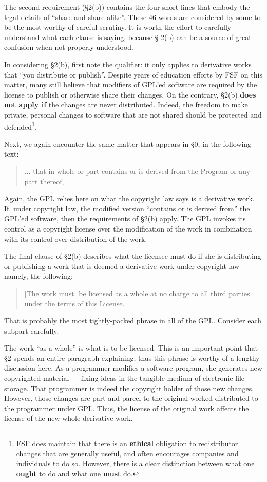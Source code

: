 \documentclass[12pt]{report}
\begin{document}
\medskip

The second requirement (\S 2(b)) contains the four short lines that embody
the legal details of ``share and share alike''.  These 46 words are
considered by some to be the most worthy of careful scrutiny.  It is worth
the effort to carefully understand what each clause is saying, because \S
2(b) can be a source of great confusion when not properly understood.

In considering \S 2(b), first note the qualifier: it only applies to
derivative works that ``you distribute or publish''.  Despite years of
education efforts by FSF on this matter, many still believe that modifiers
of GPL'ed software are required by the license to publish or otherwise
share their changes.  On the contrary, \S 2(b) {\bf does not apply if} the
changes are never distributed.  Indeed, the freedom to make private,
personal changes to software that are not shared should be protected and
defended\footnote{FSF does maintain that there is an {\bf ethical}
  obligation to redistributor changes that are generally useful, and often
  encourages companies and individuals to do so.  However, there is a
  clear distinction between what one {\bf ought} to do and what one {\bf
    must} do.}.

Next, we again encounter the same matter that appears in \S 0, in the
following text:
\begin{quote}
... that in whole or part contains or is derived from the Program or any
  part thereof,
\end{quote}
Again, the GPL relies here on what the copyright law says is a derivative
work.  If, under copyright law, the modified version ``contains or is
derived from'' the GPL'ed software, then the requirements of \S 2(b)
apply.  The GPL invokes its control as a copyright license over the
modification of the work in combination with its control over distribution
of the work.

The final clause of \S 2(b) describes what the licensee must do if she is
distributing or publishing a work that is deemed a derivative work under
copyright law --- namely, the following:
\begin{quote}
[The work must] be licensed as a whole at no charge to all third parties
under the terms of this License.
\end{quote}
That is probably the most tightly-packed phrase in all of the GPL\@.
Consider each subpart carefully.

The work ``as a whole'' is what is to be licensed.  This is an important
point that \S 2 spends an entire paragraph explaining; thus this phrase is
worthy of a lengthy discussion here.  As a programmer modifies a software
program, she generates new copyrighted material --- fixing ideas in the
tangible medium of electronic file storage.  That programmer is indeed the
copyright holder of those new changes.  However, those changes are part
and parcel to the original worked distributed to the programmer under
GPL\@.  Thus, the license of the original work affects the license of the
new whole derivative work.
\end{document}
